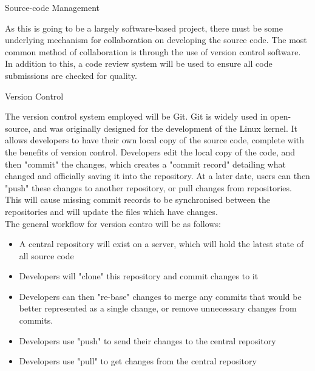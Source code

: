 \documentclass{report}
\begin{document}
\begin{section}{Source-code Management}

As this is going to be a largely software-based project, there must be some
underlying mechanism for collaboration on developing the source code. The most
common method of collaboration is through the use of version control software.
In addition to this, a code review system will be used to ensure all code
submissions are checked for quality.

\begin{subsection}{Version Control}

The version control system employed will be Git. Git is widely used in
open-source, and was originally designed for the development of the Linux
kernel. It allows developers to have their own local copy of the source code,
complete with the benefits of version control. Developers edit the local copy
of the code, and then "commit" the changes, which creates a "commit record"
detailing what changed and officially saving it into the repository. At a later
date, users can then "push" these changes to another repository, or pull
changes from repositories. This will cause missing commit records to be
synchronised between the repositories and will update the files which have
changes. \\

The general workflow for version contro will be as follows:\\

\begin{itemize}
\item A central repository will exist on a server, which will hold the latest state of all source code
\item Developers will "clone" this repository and commit changes to it
\item Developers can then "re-base" changes to merge any commits that would be
better represented as a single change, or remove unnecessary changes from
commits.
\item Developers use "push" to send their changes to the central repository
\item Developers use "pull" to get changes from the central repository
\end{itemize}

\end{subsection}

\end{section}
\end{document}
